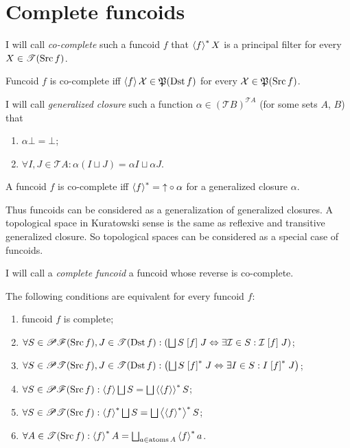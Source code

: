 \section{Complete funcoids}
\begin{defn}
I will call \emph{co-complete} such a
funcoid $f$ that $\left\langle f\right\rangle ^{\ast}X$ is a principal filter for every
$X\in\mathscr{T}(\operatorname{Src} f)$.\end{defn}
\begin{obvious}
Funcoid $f$ is co-complete iff $\left\langle f\right\rangle\mathcal{X}\in\mathfrak{P}(\operatorname{Dst} f)$
for every $\mathcal{X}\in\mathfrak{P}(\operatorname{Src} f)$.\end{obvious}
\begin{defn}
I will call \emph{generalized closure}
such a function $\alpha\in(\mathscr{T}B)^{\mathscr{T}A}$ (for some
sets $A$, $B$) that
\begin{enumerate}
\item $\alpha\bot=\bot$;
\item $\forall I,J\in\mathscr{T}A:\alpha(I\sqcup J)=\alpha I\sqcup\alpha J$.
\end{enumerate}
\end{defn}
\begin{obvious}
A funcoid $f$ is co-complete iff $\left\langle f\right\rangle ^{\ast}=\mathord{\uparrow}\circ\alpha$
for a generalized closure $\alpha$.\end{obvious}
\begin{rem}
Thus funcoids can be considered as a generalization of generalized
closures. A topological space in Kuratowski sense is the same as reflexive
and transitive generalized closure. So topological spaces can be considered
as a special case of funcoids.\end{rem}
\begin{defn}
I will call a \emph{complete funcoid} a funcoid
whose reverse is co-complete.\end{defn}
\begin{thm}
The following conditions are equivalent for every funcoid $f$:
\begin{enumerate}
\item \label{cfcd:main}funcoid $f$ is complete;
\item \label{cfcd:r-filt}$\forall S\in\subsets\mathscr{F}(\Src
f),J\in\mathscr{T}(\Dst f):\left(\bigsqcup S\suprel
fJ\Leftrightarrow\exists\mathcal{I}\in S:\mathcal{I}\suprel fJ\right)$;
\item \label{cfcd:r-set}$\forall S\in\subsets\mathscr{T}(\Src f),J\in\mathscr{T}(\Dst
f):\left(\bigsqcup S\rsuprel fJ\Leftrightarrow\exists I\in S:I\rsuprel
fJ\right)$;
\item \label{cfcd:f-filt}$\forall S\in\subsets\mathscr{F}(\Src f):\supfun
f\bigsqcup S=\bigsqcup\rsupfun{\supfun f}S$;
\item \label{cfcd:f-set}$\forall S\in\subsets\mathscr{T}(\Src f):\rsupfun
f\bigsqcup S=\bigsqcup\rsupfun{\rsupfun f}S$;
\item \label{cfcd:sing}$\forall A\in\mathscr{T}(\Src f):\rsupfun
fA=\bigsqcup_{a\in\atoms A}\rsupfun fa$.
\end{enumerate}
\end{thm}
